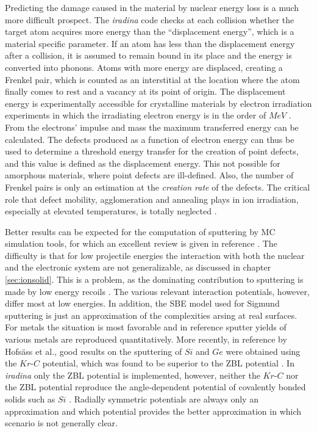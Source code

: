 Predicting the damage caused in the material by nuclear energy loss is a much more difficult prospect. The \emph{iradina} code checks at each collision whether the target atom acquires more energy than the ``displacement energy'', which is a material specific parameter. If an atom has less than the displacement energy after a collision, it is assumed to remain bound in its place and the energy is converted into phonons. Atoms with more energy are displaced, creating a Frenkel pair, which is counted as an interstitial at the location where the atom finally comes to rest and a vacancy at its point of origin. The displacement energy is experimentally accessible for crystalline materials by electron irradiation experiments in which the irradiating electron energy is in the order of $MeV$ \cite{corbett_production_1965}. From the electrons' impulse and mass the maximum transferred energy can be calculated. The defects produced as a function of electron energy can thus be used to determine a threshold energy transfer for the creation of point defects, and this value is defined as the displacement energy. This not possible for amorphous materials, where point defects are ill-defined. Also, the number of Frenkel pairs is only an estimation at the \emph{creation rate} of the defects. The critical role that defect mobility, agglomeration and annealing plays in ion irradiation, especially at elevated temperatures, is totally neglected \cite{pelaz_ion-beam-induced_2004,nordlund_correction_2014}.

Better results can be expected for the computation of sputtering by MC simulation tools, for which an excellent review is given in reference \cite{biersack_computer_1987}. The difficulty is that for low projectile energies the interaction with both the nuclear and the electronic system are not generalizable, as discussed in chapter \ref{sec:ionsolid}. This is a problem, as the dominating contribution to sputtering is made by low energy recoils \cite{thompson_energy_1968}. The various relevant interaction potentials, however, differ most at low energies. In addition, the SBE model used for Sigmund sputtering is just an approximation of the complexities arsing at real surfaces. For metals the situation is most favorable and in reference \cite{biersack_computer_1987} sputter yields of various metals are reproduced quantitatively. More recently, in reference \cite{hofsass_simulation_2014} by Hofsäss et al., good results on the sputtering of $Si$ and $Ge$ were obtained using the $Kr$-$C$ \cite{wilson_calculations_1977} potential, which was found to be superior to the ZBL potential \cite{ziegler_stopping_1985}. In \emph{iradina} only the ZBL potential is implemented, however, neither the $Kr$-$C$ nor the ZBL potential reproduce the angle-dependent potential of covalently bonded solids such as $Si$ \cite{stillinger_computer_1985,tersoff_new_1988}. Radially symmetric potentials are always only an approximation and which potential provides the better approximation in which scenario is not generally clear.

